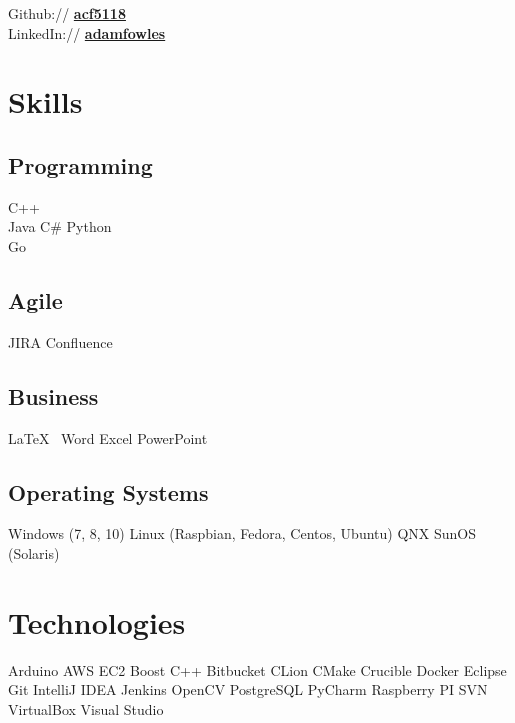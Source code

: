 \documentclass[letterpaper]{fowles-resume} %
\begin{document}
\begin{minipage}[t]{0.33\textwidth}
Github:// \href{https://github.com/acf5118}{\bf acf5118} \\
LinkedIn:// \href{https://www.linkedin.com/in/adamfowles}{\bf adamfowles} \\

\sectionspace %

\section{Skills}

\subsection{Programming}
C++ \\
Java \textbullet{} C\# \textbullet{} Python\\
Go
\smallskip
\subsection{Agile}
JIRA \textbullet{} Confluence
\smallskip
\subsection{Business}
\LaTeX\ \textbullet{} Word \textbullet{} Excel
\textbullet{} PowerPoint
\smallskip
\subsection{Operating Systems}
Windows (7, 8, 10) \textbullet{} Linux (Raspbian, Fedora, Centos, Ubuntu)
\textbullet{} QNX \textbullet{} SunOS (Solaris)



\sectionspace %

\section{Technologies}
Arduino \textbullet{} AWS EC2 \textbullet{} Boost C++ \textbullet{} Bitbucket \textbullet{} CLion \textbullet{} CMake \textbullet{} Crucible \textbullet{} Docker \textbullet{} Eclipse \textbullet{} Git \textbullet{} IntelliJ IDEA \textbullet{} Jenkins \textbullet{} OpenCV \textbullet{} PostgreSQL \textbullet{} PyCharm  \textbullet{} Raspberry PI \textbullet{} SVN \textbullet{} VirtualBox \textbullet{} Visual Studio


\end{minipage}
\end{document}
